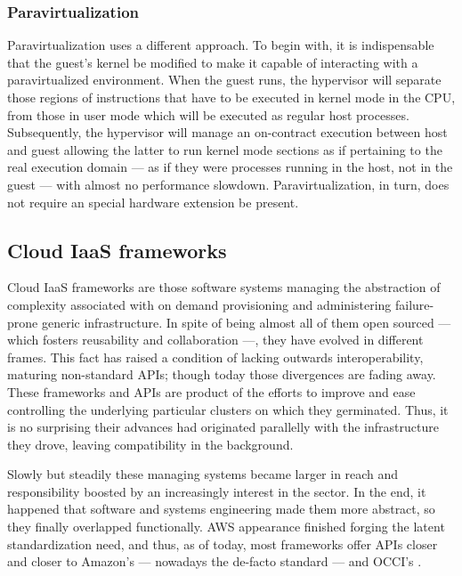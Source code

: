 \subsubsection{Paravirtualization}\label{subsubsec:paravirt}

\noindent Paravirtualization uses a different approach. To begin with, it is indispensable that the guest's kernel be modified to make it capable of interacting with a paravirtualized environment. When the guest runs, the hypervisor will separate those regions of instructions that have to be executed in kernel mode in the CPU, from those in user mode which will be executed as regular host processes. Subsequently, the hypervisor will manage an on-contract execution between host and guest allowing the latter to run kernel mode sections as if pertaining to the real execution domain --- as if they were processes running in the host, not in the guest --- with almost no performance slowdown. Paravirtualization, in turn, does not require an special hardware extension be present.

\subsection{Cloud IaaS frameworks}\label{subsec:frameworksiaas}

\noindent Cloud IaaS frameworks are those software systems managing the abstraction of complexity associated with on demand provisioning and administering failure-prone generic infrastructure. In spite of being almost all of them open sourced --- which fosters reusability and collaboration ---, they have evolved in different frames. This fact has raised a condition of lacking outwards interoperability, maturing non-standard APIs; though today those divergences are fading away. These frameworks and APIs are product of the efforts to improve and ease controlling the underlying particular clusters on which they germinated. Thus, it is no surprising their advances had originated parallelly with the infrastructure they drove, leaving compatibility in the background.

Slowly but steadily these managing systems became larger in reach and responsibility boosted by an increasingly interest in the sector. In the end, it happened that software and systems engineering made them more abstract, so they finally overlapped functionally. AWS appearance finished forging the latent standardization need, and thus, as of today, most frameworks offer APIs closer and closer to Amazon's --- nowadays the de-facto standard --- and OCCI's \cite{occisdraft}.

